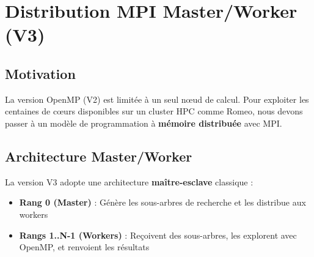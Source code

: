 \documentclass[12pt,a4paper,twoside]{report}
\begin{document}
\chapter{Distribution MPI Master/Worker (V3)}

\section{Motivation}

La version OpenMP (V2) est limitée à un seul nœud de calcul. Pour exploiter les centaines de cœurs disponibles sur un cluster HPC comme Romeo, nous devons passer à un modèle de programmation à \textbf{mémoire distribuée} avec MPI.

\section{Architecture Master/Worker}

La version V3 adopte une architecture \textbf{maître-esclave} classique :

\begin{itemize}
    \item \textbf{Rang 0 (Master)} : Génère les sous-arbres de recherche et les distribue aux workers
    \item \textbf{Rangs 1..N-1 (Workers)} : Reçoivent des sous-arbres, les explorent avec OpenMP, et renvoient les résultats
\end{itemize}
\end{document}
